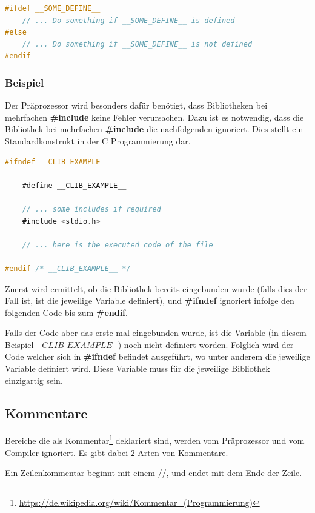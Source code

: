 \begin{lstlisting}[language=C]
#ifdef __SOME_DEFINE__
	// ... Do something if __SOME_DEFINE__ is defined
#else
	// ... Do something if __SOME_DEFINE__ is not defined
#endif
\end{lstlisting}

\subsubsection{Beispiel}

Der Pr\"aprozessor wird besonders daf\"ur ben\"otigt, dass Bibliotheken bei mehrfachen \textbf{\#include} keine Fehler verursachen. Dazu ist es notwendig, dass die Bibliothek bei mehrfachen \textbf{\#include} die nachfolgenden ignoriert. Dies stellt ein Standardkonstrukt in der C Programmierung dar.

\begin{lstlisting}[language=C]
#ifndef __CLIB_EXAMPLE__

	#define __CLIB_EXAMPLE__
	
	// ... some includes if required
	#include <stdio.h>

	// ... here is the executed code of the file

#endif /* __CLIB_EXAMPLE__ */
\end{lstlisting}

Zuerst wird ermittelt, ob die Bibliothek bereits eingebunden wurde (falls dies der Fall ist, ist die jeweilige Variable definiert), und \textbf{\#ifndef} ignoriert infolge den folgenden Code bis zum \textbf{\#endif}.

Falls der Code aber das erste mal eingebunden wurde, ist die Variable (in diesem Beispiel $\_\_CLIB\_EXAMPLE\_\_$) noch nicht definiert worden. Folglich wird der Code welcher sich in \textbf{\#ifndef} befindet ausgef\"uhrt, wo unter anderem die jeweilige Variable definiert wird. Diese Variable muss f\"ur die jeweilige Bibliothek einzigartig sein.

\subsection{Kommentare}

Bereiche die als Kommentar\footnote{\url{https://de.wikipedia.org/wiki/Kommentar_(Programmierung)}} deklariert sind, werden vom Pr\"aprozessor und vom Compiler ignoriert. Es gibt dabei 2 Arten von Kommentare.


Ein Zeilenkommentar beginnt mit einem //, und endet mit dem Ende der Zeile.

